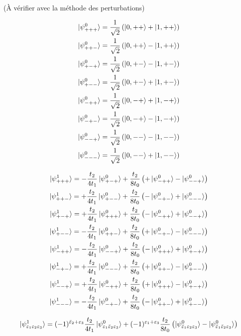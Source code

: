 \documentclass[11pt]{article}
\begin{document}
(À vérifier avec la méthode des perturbations)

\begin{align}
	\ket{\psi^0_{+++}} = \frac{1}{\sqrt{2}}\left( \ket{0,++} + \ket{1,++} \right) \\
	\ket{\psi^0_{++-}} = \frac{1}{\sqrt{2}}\left( \ket{0,++} - \ket{1,++} \right) \\
	\ket{\psi^0_{+-+}} = \frac{1}{\sqrt{2}}\left( \ket{0,+-} - \ket{1,+-} \right) \\
	\ket{\psi^0_{+--}} = \frac{1}{\sqrt{2}}\left( \ket{0,+-} + \ket{1,+-} \right) \\
	\ket{\psi^0_{-++}} = \frac{1}{\sqrt{2}}\left( \ket{0,-+} + \ket{1,-+} \right) \\
	\ket{\psi^0_{-+-}} = \frac{1}{\sqrt{2}}\left( \ket{0,-+} - \ket{1,-+} \right) \\
	\ket{\psi^0_{--+}} = \frac{1}{\sqrt{2}}\left( \ket{0,--} - \ket{1,--} \right) \\
	\ket{\psi^0_{---}} = \frac{1}{\sqrt{2}}\left( \ket{0,--} + \ket{1,--} \right)
\end{align}

\begin{align}
	\ket{\psi^1_{+++}} = -\frac{t_2}{4 t_1} \ket{\psi^0_{+-+}} + \frac{t_2}{8 t_0}\left( +\ket{\psi^0_{-++}} - \ket{\psi^0_{--+}} \right) \\
	\ket{\psi^1_{++-}} = +\frac{t_2}{4 t_1} \ket{\psi^0_{+--}} + \frac{t_2}{8 t_0} \left( -\ket{\psi^0_{-+-}} + \ket{\psi^0_{---}} \right) \\
	\ket{\psi^1_{+-+}} = +\frac{t_2}{4 t_1} \ket{\psi^0_{+++}} +  \frac{t_2}{8 t_0} \left( -\ket{\psi^0_{-++}} + \ket{\psi^0_{--+}} \right) \\
	\ket{\psi^1_{+--}} = -\frac{t_2}{4 t_1} \ket{\psi^0_{++-}} +  \frac{t_2}{8 t_0} \left( +\ket{\psi^0_{-+-}} - \ket{\psi^0_{---}} \right) \\
	\ket{\psi^1_{-++}} = -\frac{t_2}{4 t_1} \ket{\psi^0_{--+}} + \frac{t_2}{8 t_0}\left( -\ket{\psi^0_{+++}} + \ket{\psi^0_{+-+}} \right) \\
	\ket{\psi^1_{-+-}} = +\frac{t_2}{4 t_1} \ket{\psi^0_{---}} + \frac{t_2}{8 t_0}\left( +\ket{\psi^0_{++-}} - \ket{\psi^0_{+--}} \right) \\
	\ket{\psi^1_{--+}} = +\frac{t_2}{4 t_1} \ket{\psi^0_{-++}} + \frac{t_2}{8 t_0}\left( +\ket{\psi^0_{+++}} - \ket{\psi^0_{+-+}} \right) \\
	\ket{\psi^1_{---}} = -\frac{t_2}{4 t_1} \ket{\psi^0_{-+-}} + \frac{t_2}{8 t_0}\left( -\ket{\psi^0_{++-}} + \ket{\psi^0_{+--}} \right)
\end{align}

\begin{equation}
	\ket{\psi^1_{\varepsilon_1 \varepsilon_2 \varepsilon_3}} = (-1)^{\bar{\varepsilon}_2 + \varepsilon_3} \frac{t_2}{4 t_1} \ket{\psi^0_{\varepsilon_1 \bar{\varepsilon}_2 \varepsilon_3}} + (-1)^{\varepsilon_1 + \varepsilon_3} \frac{t_2}{8 t_0} \left( \ket{\psi^0_{\bar{\varepsilon}_1 \varepsilon_2 \varepsilon_3}} - \ket{\psi^0_{\bar{\varepsilon}_1 \bar{\varepsilon}_2 \varepsilon_3}} \right)
\end{equation}
\end{document}
